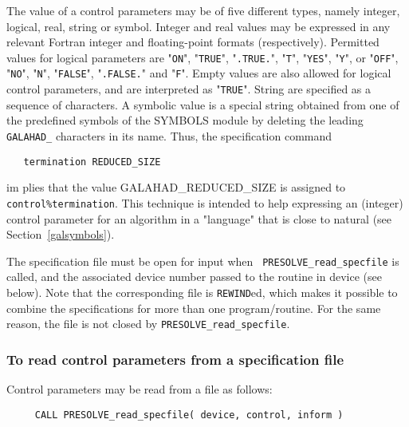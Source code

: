 \documentclass{galahad}
\newcommand{\packagename}{PRESOLVE}
\newcommand{\sym}{\sf\small}
\begin{document}
The value of a control parameters may be of five different types, namely
integer, logical, real, string or symbol.
Integer and real values may be expressed in any relevant Fortran integer and
floating-point formats (respectively). Permitted values for logical
parameters are "{\tt ON}", "{\tt TRUE}", "{\tt .TRUE.}", "{\tt T}", 
"{\tt YES}", "{\tt Y}", or "{\tt OFF}", "{\tt NO}",
"{\tt N}", "{\tt FALSE}", "{\tt .FALSE.}" and "{\tt F}". 
Empty values are also allowed for logical control parameters, and are
interpreted as "{\tt TRUE}". String are specified as a sequence of characters.  
A symbolic value is a special string obtained from one of the predefined
symbols of the SYMBOLS module by deleting the leading {\tt GALAHAD\_}
characters in its name. Thus, the specification command
\begin{verbatim}
   termination REDUCED_SIZE
\end{verbatim}
im plies that the value {\sym GALAHAD\_REDUCED\_SIZE} is assigned to {\tt
control\%termination}.  This technique is intended to help expressing an
(integer) control parameter for an algorithm  in a "language" that is close to
natural (see Section~\ref{galsymbols}). 

The specification file must be open for input when {\tt
\packagename\_read\_specfile} is called, and the associated device number
passed to the routine in device (see below).  Note that the corresponding  
file is {\tt REWIND}ed, which makes it possible to combine the specifications 
for more than one program/routine.  For the same reason, the file is not
closed by {\tt \packagename\_read\_specfile}.

\subsubsection{To read control parameters from a specification file}
\label{readspec}

Control parameters may be read from a file as follows:
\hskip0.5in 
\def\baselinestretch{0.8} {\tt \begin{verbatim}
     CALL PRESOLVE_read_specfile( device, control, inform )
\end{verbatim}}
\def\baselinestretch{1.0}
\end{document}
